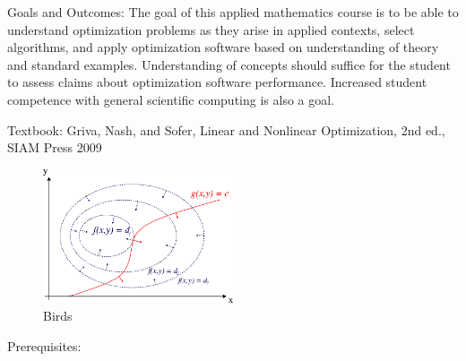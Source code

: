 \documentclass[12pt]{amsart}
\begin{document}
Goals and Outcomes:
The goal of this applied mathematics course is to be able to understand optimization problems as they arise in applied contexts, select algorithms, and apply optimization software based on understanding of theory and standard examples. Understanding of concepts should suffice for the student to assess claims about optimization software performance. Increased student competence with general scientific computing is also a goal.

Textbook:
Griva, Nash, and Sofer, Linear and Nonlinear Optimization, 2nd ed., SIAM Press 2009 

\begin{figure}
  \centering
    \includegraphics[width=0.5\textwidth]{../images/lagrange.png}
\captionsetup{margin=1.2cm}
  \caption{Birds}
\end{figure}

Prerequisites: 
\end{document}
